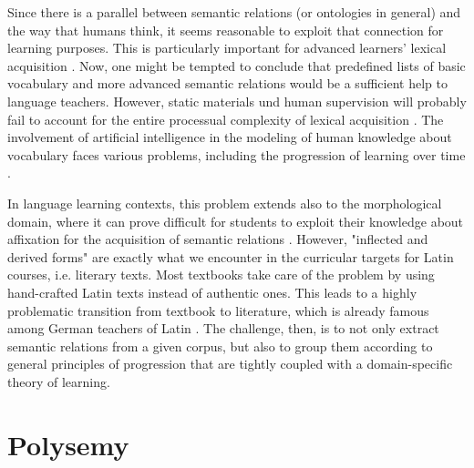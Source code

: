 \documentclass[oneside]{book}
\begin{document}
Since there is a parallel between semantic relations (or ontologies in general) and the way that humans think, it seems reasonable to exploit that connection for learning purposes. This is particularly important for advanced learners' lexical acquisition \parencite[56]{crossleyDevelopmentSemanticRelations2010}. Now, one might be tempted to conclude that predefined lists of basic vocabulary and more advanced semantic relations would be a sufficient help to language teachers. However, static materials und human supervision will probably fail to account for the entire processual complexity of lexical acquisition \parencite[71]{crossleyDevelopmentSemanticRelations2010}. The involvement of artificial intelligence in the modeling of human knowledge about vocabulary faces various problems, including the progression of learning over time \parencite[70]{crossleyDevelopmentSemanticRelations2010}. 

In language learning contexts, this problem extends also to the morphological domain, where it can prove difficult for students to exploit their knowledge about affixation for the acquisition of semantic relations \parencite[248]{gardnerValidatingConstructWord2007}. However, "inflected and derived forms" are exactly what we encounter in the curricular targets for Latin courses, i.e. literary texts. Most textbooks take care of the problem by using hand-crafted Latin texts instead of authentic ones. This leads to a highly problematic transition from textbook to literature, which is already famous among German teachers of Latin \parencite[115]{schibelZurAneignungLateinischer2013}. The challenge, then, is to not only extract semantic relations from a given corpus, but also to group them according to general principles of progression that are tightly coupled with a domain-specific theory of learning.

\chapter{Polysemy}
\end{document}
